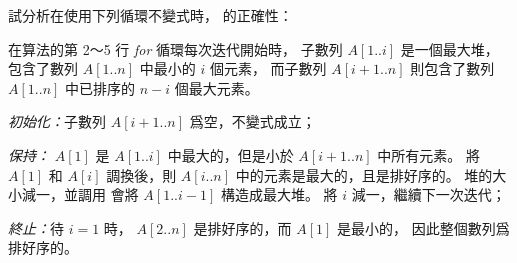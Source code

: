 \startEXERCISE
試分析在使用下列循環不變式時，  的正確性：

在算法的第 2～5 行 \emph{for} 循環每次迭代開始時，
子數列 $A[1..i]$ 是一個最大堆，包含了數列 $A[1..n]$ 中最小的 $i$ 個元素，
而子數列 $A[i+1..n]$ 則包含了數列 $A[1..n]$ 中已排序的 $n-i$ 個最大元素。
\stopEXERCISE

\startANSWER
\emph{初始化：}子數列 $A[i+1..n]$ 爲空，不變式成立；

\emph{保持：} $A[1]$ 是 $A[1..i]$ 中最大的，但是小於 $A[i+1..n]$ 中所有元素。
將 $A[1]$ 和 $A[i]$ 調換後，則 $A[i..n]$ 中的元素是最大的，且是排好序的。
堆的大小減一，並調用  會將 $A[1..i-1]$ 構造成最大堆。
將 $i$ 減一，繼續下一次迭代；

\emph{終止：}待 $i=1$ 時， $A[2..n]$ 是排好序的，而 $A[1]$ 是最小的，
因此整個數列爲排好序的。
\stopANSWER

